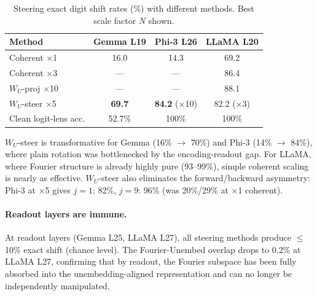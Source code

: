 \begin{table}[t]
\centering
\caption{Steering exact digit shift rates (\%) with different methods. Best scale factor $N$ shown.}
\label{tab:steering}
\small
\begin{tabular}{lccc}
\toprule
\textbf{Method} & \textbf{Gemma L19} & \textbf{Phi-3 L26} & \textbf{LLaMA L20} \\
\midrule
Coherent $\times$1 & 16.0 & 14.3 & 69.2 \\
Coherent $\times$3 & --- & --- & 86.4 \\
$W_U$-proj $\times$10 & --- & --- & 88.1 \\
$W_U$-steer $\times$5 & \textbf{69.7} & \textbf{84.2} ($\times$10) & 82.2 ($\times$3) \\
\midrule
Clean logit-lens acc. & 52.7\% & 100\% & 100\% \\
\bottomrule
\end{tabular}
\end{table}

$W_U$-steer is transformative for Gemma (16\% $\rightarrow$ 70\%) and Phi-3 (14\% $\rightarrow$ 84\%), where plain rotation was bottlenecked by the encoding-readout gap. For LLaMA, where Fourier structure is already highly pure (93--99\%), simple coherent scaling is nearly as effective. $W_U$-steer also eliminates the forward/backward asymmetry: Phi-3 at $\times$5 gives $j{=}1$: 82\%, $j{=}9$: 96\% (was 20\%/29\% at $\times$1 coherent).

\paragraph{Readout layers are immune.} At readout layers (Gemma L25, LLaMA L27), all steering methods produce $\leq$10\% exact shift (chance level). The Fourier-Unembed overlap drops to 0.2\% at LLaMA L27, confirming that by readout, the Fourier subspace has been fully absorbed into the unembedding-aligned representation and can no longer be independently manipulated.
